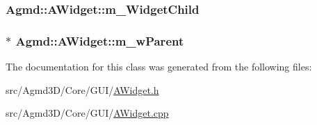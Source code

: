 \hypertarget{class_agmd_1_1_a_widget_ac337e837ab1cdbad366d3c2cb2d53294}{
\subsubsection[{m\+\_\+\+Widget\+Child}]{ Agmd\+::\+A\+Widget\+::m\+\_\+\+Widget\+Child\hspace{0.3cm}{\ttfamily [protected]}}}\label{class_agmd_1_1_a_widget_ac337e837ab1cdbad366d3c2cb2d53294}
\hypertarget{class_agmd_1_1_a_widget_aa2f111deaa61119d5ca22ebfe3ffde0b}{
\subsubsection[{m\+\_\+w\+Parent}]{$\ast$ Agmd\+::\+A\+Widget\+::m\+\_\+w\+Parent\hspace{0.3cm}{\ttfamily [protected]}}}\label{class_agmd_1_1_a_widget_aa2f111deaa61119d5ca22ebfe3ffde0b}


The documentation for this class was generated from the following files\+:\begin{DoxyCompactItemize}
\item 
src/\+Agmd3\+D/\+Core/\+G\+U\+I/\hyperlink{_a_widget_8h}{A\+Widget.\+h}\item 
src/\+Agmd3\+D/\+Core/\+G\+U\+I/\hyperlink{_a_widget_8cpp}{A\+Widget.\+cpp}\end{DoxyCompactItemize}
